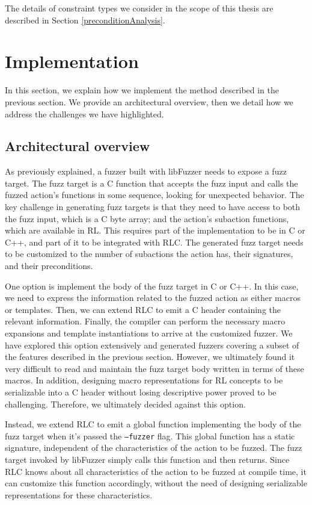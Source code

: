 The details of constraint types we consider in the scope of this thesis are described in Section \ref{preconditionAnalysis}. 

\section{Implementation}
In this section, we explain how we implement the method described in the previous section.
We provide an architectural overview, then we detail how we address the challenges we have highlighted.

\subsection{Architectural overview} \label{architecture}
As previously explained, a fuzzer built with libFuzzer needs to expose a fuzz target.
The fuzz target is a C function that accepts the fuzz input and calls the fuzzed action's functions in some sequence, looking for unexpected behavior.
The key challenge in generating fuzz targets is that they need to have access to both the fuzz input, which is a C byte array; and the action's subaction functions, which are available in RL.
This requires part of the implementation to be in C or C++, and part of it to be integrated with RLC.
The generated fuzz target needs to be customized to the number of subactions the action has, their signatures, and their preconditions.

One option is implement the body of the fuzz target in C or C++.
In this case, we need to express the information related to the fuzzed action as either macros or templates.
Then, we can extend RLC to emit a C header containing the relevant information.
Finally, the compiler can perform the necessary macro expansions and template instantiations to arrive at the customized fuzzer.
We have explored this option extensively and generated fuzzers covering a subset of the features described in the previous section.
However, we ultimately found it very difficult to read and maintain the fuzz target body written in terms of these macros.
In addition, designing macro representations for RL concepts to be serializable into a C header without losing descriptive power proved to be challenging.
Therefore, we ultimately decided against this option.

Instead, we extend RLC to emit a global function implementing the body of the fuzz target when it's passed the \texttt{--fuzzer} flag.
This global function has a static signature, independent of the characteristics of the action to be fuzzed.
The fuzz target invoked by libFuzzer simply calls this function and then returns.
Since RLC knows about all characteristics of the action to be fuzzed at compile time, it can customize this function accordingly, without the need of designing serializable representations for these characteristics.

